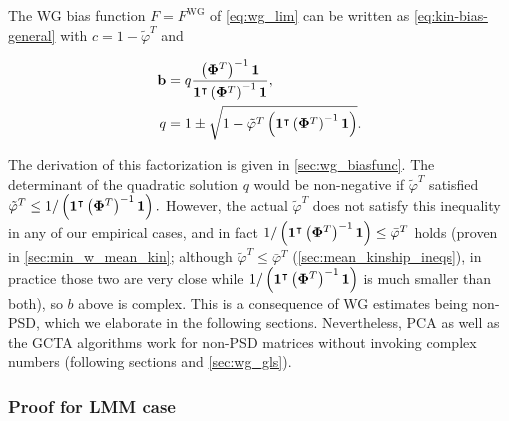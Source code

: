 \documentclass[11pt]{article}
\newcommand{\kinMat}[1][T]{%
  \ensuremath{%
    \mathbf{\Phi}^{#1}
  }%
  \xspace%
}%
\begin{document}
\begin{linenumbers}
The WG bias function $F = F^\text{WG}$ of \cref{eq:wg_lim} can be written as \cref{eq:kin-bias-general} with
$c = 1 - \tilde{\varphi}^T$ and
\begin{linenomath*}
\begin{align}
  \label{eq:wg-fac-b}
  \mathbf{b}
  &=
    q \frac{ \left( \kinMat \right)^{-1} \mathbf{1} }{ \mathbf{1}^\intercal \left( \kinMat \right)^{-1} \mathbf{1} }
    , \\
  \label{eq:wg-fac-q}
  q
  &=
    1 \pm \sqrt{1 - \tilde{\varphi}^T \left( \mathbf{1}^\intercal \left( \kinMat \right)^{-1} \mathbf{1} \right) }
.
\end{align}
\end{linenomath*}
The derivation of this factorization is given in \cref{sec:wg_biasfunc}.
The determinant of the quadratic solution $q$ would be non-negative if $\tilde{\varphi}^T$ satisfied
$
\tilde{\varphi}^T \le 1 / \left( \mathbf{1}^\intercal \left( \kinMat \right)^{-1} \mathbf{1} \right).
$
However, the actual $\tilde{\varphi}^T$ does not satisfy this inequality in any of our empirical cases, and in fact $1 / \left( \mathbf{1}^\intercal \left( \kinMat \right)^{-1} \mathbf{1} \right) \le \bar{\varphi}^T$ holds (proven in \cref{sec:min_w_mean_kin}; although $\tilde{\varphi}^T \le \bar{\varphi}^T$ (\cref{sec:mean_kinship_ineqs}), in practice those two are very close while $1 / \left( \mathbf{1}^\intercal \left( \kinMat \right)^{-1} \mathbf{1} \right)$ is much smaller than both), so $b$ above is complex.
This is a consequence of WG estimates being non-PSD, which we elaborate in the following sections.
Nevertheless, PCA as well as the GCTA algorithms work for non-PSD matrices without invoking complex numbers (following sections and \cref{sec:wg_gls}).

\subsubsection{Proof for LMM case}


\end{linenumbers}
\end{document}

